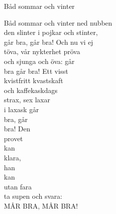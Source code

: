 \begin{song}{Båd sommar och vinter}

	
	Båd sommar och vinter ned nubben\\
	den slinter i pojkar och stinter,\\
	går bra, går bra! Och nu vi ej\\
	töva, vår nykterhet pröva\\
	och sjunga och öva: går\\ 
	bra går bra! Ett visst\\
	kvistfritt kvastskaft\\ 
	och kaffekaskdags\\
	strax, sex laxar\\
	i laxask går\\
	bra, går\\
	bra! Den\\ 
	provet\\
	kan\\
	klara,\\
	han\\
	kan\\
	utan fara\\
	ta supen och svara:\\
	MÅR BRA, MÅR BRA!
	
\end{song}
